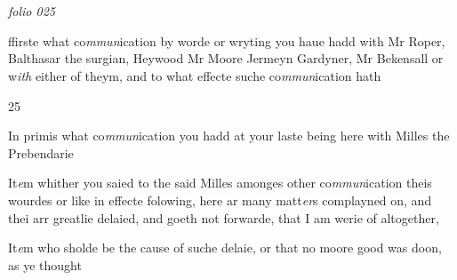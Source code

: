 \documentclass[12pt, a4paper]{book}
\begin{document}
\dotfill
						\newpage {} \section*{}  \subsection*{}

\textit{folio 025}




		\ifthenelse{\isodd{\thepage}}
		{\reversemarginpar}
		{\normalmarginpar}
		ffirste what co\textit{mmun}ication by worde or wryting you haue hadd
	with Mr Roper, Balthasar the surgian, Heywood Mr Moore
	Jermeyn Gardyner, Mr Bekensall or w\textit{ith} either of theym, and
 to what effecte suche co\textit{mmun}ication hath
            		\begin{flushright}{\color{Mahogany}25}\end{flushright}
            		
            			
				\marginpar[\vspace{0.5cm}{\textcolor{Gray}{+n}}]{}
			
            			
		\ifthenelse{\isodd{\thepage}}
		{\reversemarginpar}
		{\normalmarginpar}
		In primis what co\textit{mmun}ication you hadd at your laste being here
            				with Milles the Prebendarie
            		
				\marginpar[\vspace{0.5cm}{\textcolor{Gray}{+n}}]{}
			
		\ifthenelse{\isodd{\thepage}}
		{\reversemarginpar}
		{\normalmarginpar}
		It\textit{e}m whither you saied to the said Milles amonges other co\textit{mmun}ication
 theis wourdes or like in effecte folowing, here ar many matt\textit{er}s
 complayned on, and thei arr greatlie delaied, and goeth not
 forwarde, that I am werie of altogether,
            		
				\marginpar[\vspace{0.5cm}{\textcolor{Gray}{n}}]{}
			
		\ifthenelse{\isodd{\thepage}}
		{\reversemarginpar}
		{\normalmarginpar}
		It\textit{e}m who sholde be the cause of suche delaie, or that no moore
 good was doon, as ye thought
            		
				\marginpar[\vspace{0.5cm}{\textcolor{Gray}{n}}]{}
			
\end{document}
